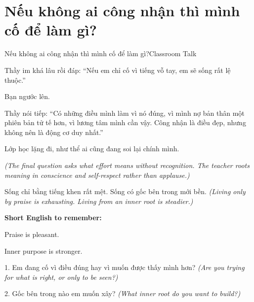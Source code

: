 \section{Nếu không ai công nhận thì mình cố để làm gì?}
\begin{truyen}{Nếu không ai công nhận thì mình cố để làm gì?}{Classroom Talk}

Thầy im khá lâu rồi đáp: ``Nếu em chỉ cố vì tiếng vỗ tay, em sẽ sống rất lệ thuộc.''

Bạn ngước lên.

Thầy nói tiếp: ``Có những điều mình làm vì nó đúng, vì mình nợ bản thân một phiên bản tử tế hơn, vì lương tâm mình cần vậy. Công nhận là điều đẹp, nhưng không nên là động cơ duy nhất.''

Lớp học lặng đi, như thể ai cũng đang soi lại chính mình.

\textit{(The final question asks what effort means without recognition. The teacher roots meaning in conscience and self-respect rather than applause.)}
\end{truyen}

\begin{baihoc}
Sống chỉ bằng tiếng khen rất mệt. Sống có gốc bên trong mới bền.
\textit{(Living only by praise is exhausting. Living from an inner root is steadier.)}
\end{baihoc}

\begin{ghinhoanh}
\textbf{Short English to remember:}

Praise is pleasant.

Inner purpose is stronger.
\end{ghinhoanh}

\begin{tuhocnhanh}
1. Em đang cố vì điều đúng hay vì muốn được thấy mình hơn? \textit{(Are you trying for what is right, or only to be seen?)}

2. Gốc bên trong nào em muốn xây? \textit{(What inner root do you want to build?)}
\end{tuhocnhanh}
\ngancach